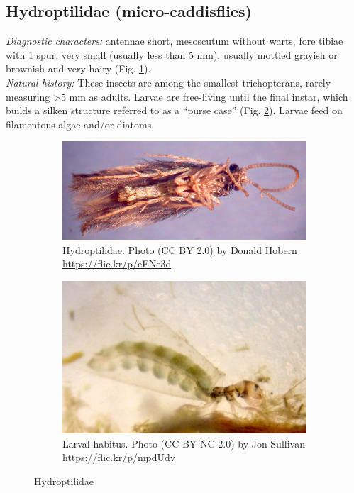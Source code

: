 \documentclass[letterpaper, 11pt]{article}
\begin{document}
\subsection{Hydroptilidae (micro-caddisflies)}
\noindent{}\textit{Diagnostic characters:} antennae short, mesoscutum without warts, fore tibiae with 1 spur, very small (usually less than 5 mm), usually mottled grayish or brownish and very hairy (Fig. \ref{fig:hydrop1}).\\

\noindent{}\textit{Natural history:} These insects are among the smallest trichopterans, rarely measuring \textgreater5 mm as adults. Larvae are free-living until the final instar, which builds a silken structure referred to as a ``purse case'' (Fig. \ref{fig:hydroptilid2}). Larvae feed on filamentous algae and/or diatoms.

\begin{figure}[ht!]
    \centering
    \begin{subfigure}[ht!]{0.5\textwidth}
        \includegraphics[width=\textwidth]{HydroptilidHabitus}
        \caption{Hydroptilidae. Photo (CC BY 2.0) by Donald Hobern \url{https://flic.kr/p/eENe3d}}
        \label{fig:hydrop1}
    \end{subfigure}
    \hfill %
    \begin{subfigure}[ht!]{0.45\textwidth}
        \includegraphics[width=\textwidth]{HydroptilidLarva}
        \caption{Larval habitus. Photo (CC BY-NC 2.0) by Jon Sullivan \url{https://flic.kr/p/mpdUdv}}
        \label{fig:hydroptilid2}
    \end{subfigure}
    \caption{Hydroptilidae}\label{fig:hydroptilids}
\end{figure}
\end{document}
